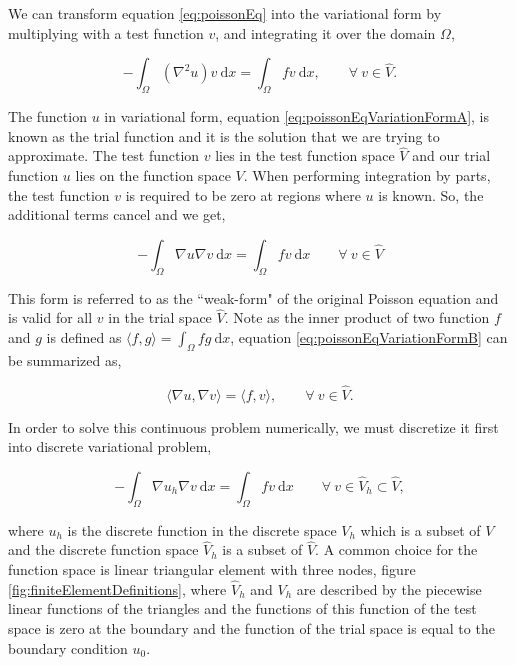 We can transform equation \ref{eq:poissonEq} into the variational form by multiplying with a test function $v$, and integrating it over the domain $\Omega$,


	\begin{equation}
	- \int_{\Omega} \left(\nabla^2 u\right)v\ \mathrm{d}x= \int_{\Omega} fv\ \mathrm{d}x, \qquad \forall\ v \in \hat{V}.
	\label{eq:poissonEqVariationFormA}
	\end{equation}

The function $u$ in variational form, equation \ref{eq:poissonEqVariationFormA}, is known as the trial function and it is the solution that we are trying to approximate. The test function $v$ lies in the test function space $\hat{V}$ and our trial function $u$ lies on the function space $V$. When performing integration by parts, the test function $v$ is required to be zero at regions where $u$ is known. So, the additional terms cancel and we get,

	\begin{equation}
	- \int_{\Omega} \nabla u \nabla v\ \mathrm{d}x= \int_{\Omega} fv\ \mathrm{d}x \qquad \forall\ v \in \hat{V}
	\label{eq:poissonEqVariationFormB}
	\end{equation}

This form is referred to as the ``weak-form" of the original Poisson equation and is valid for all $v$ in the trial space $\hat{V}$. Note as the inner product of two function $f$ and $g$ is defined as $\langle f,g \rangle = \int_{\Omega}fg\ \mathrm{d}x$, equation \ref{eq:poissonEqVariationFormB} can be summarized as,

	\begin{equation}
	\langle \nabla u,\nabla v \rangle = \langle f,v \rangle, \qquad \forall\ v \in \hat{V}.
	\end{equation}

In order to solve this continuous problem numerically, we must discretize it first into discrete variational problem,

	\begin{equation}
	- \int_{\Omega} \nabla u_h \nabla v\ \mathrm{d}x= \int_{\Omega} fv\ \mathrm{d}x \qquad \forall\ v \in \hat{V}_h \subset \hat{V},
	\label{eq:poissonEqDiscreteVariational}
	\end{equation}

where $u_h$ is the discrete function in the discrete space $V_h$ which is a subset of $V$ and the discrete function space $\hat{V}_h$ is a subset of $\hat{V}$. A common choice for the function space is linear triangular element with three nodes, figure \ref{fig:finiteElementDefinitions}, where $\hat{V}_h$ and $V_h$ are described by the piecewise linear functions of the triangles and the functions of this function of the test space is zero at the boundary and the function of the trial space is equal to the boundary condition $u_0$.

